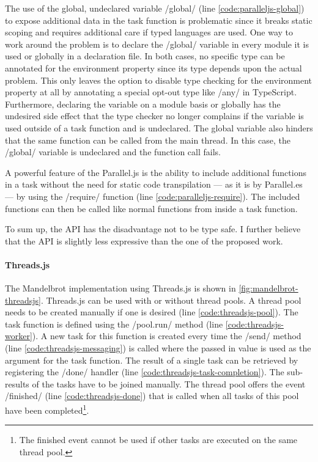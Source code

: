 The use of the global, undeclared variable \javascriptinline/global/ (line \ref{code:paralleljs-global}) to expose additional data in the task function is problematic since it breaks static scoping and requires additional care if typed languages are used. One way to work around the problem is to declare the \javascriptinline/global/ variable in every module it is used or globally in a declaration file. In both cases, no specific type can be annotated for the environment property since its type depends upon the actual problem. This only leaves the option to disable type checking for the environment property at all by annotating a special opt-out type like \javascriptinline/any/ in TypeScript. Furthermore, declaring the variable on a module basis or globally has the undesired side effect that the type checker no longer complains if the variable is used outside of a task function and is undeclared. The global variable also hinders that the same function can be called from the main thread. In this case, the \javascriptinline/global/ variable is undeclared and the function call fails.

A powerful feature of the Parallel.js is the ability to include additional functions in a task without the need for static code transpilation --- as it is by Parallel.es --- by using the \javascriptinline/require/ function (line \ref{code:paralleljs-require}). The included functions can then be called like normal functions from inside a task function. 

To sum up, the API has the disadvantage not to be type safe. I further believe that the API is slightly less expressive than the one of the proposed work.

\paragraph{Threads.js}
 The Mandelbrot implementation using Threads.js is shown in \cref{fig:mandelbrot-threadsjs}. Threads.js can be used with or without thread pools. A thread pool needs to be created manually if one is desired (line \ref{code:threadsjs-pool}). The task function is defined using the \javascriptinline/pool.run/ method (line \ref{code:threadsjs-worker}). A new task for this function is created every time the \javascriptinline/send/ method (line \ref{code:threadsjs-messaging}) is called where the passed in value is used as the argument for the task function. The result of a single task can be retrieved by registering the \javascriptinline/done/ handler (line \ref{code:threadsjs-task-completion}). The sub-results of the tasks have to be joined manually. The thread pool offers the event \javascriptinline/finished/ (line \ref{code:threadsjs-done}) that is called when all tasks of this pool have been completed\footnote{The finished event cannot be used if other tasks are executed on the same thread pool.}.

